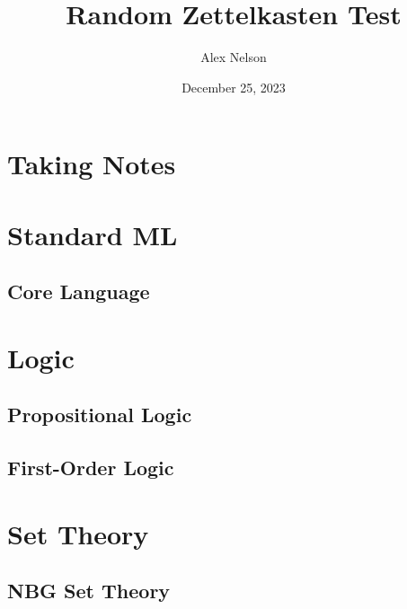 \documentclass[oneside]{amsbook}%
\title{Random Zettelkasten Test}
\author{Alex Nelson}
\date{December 25, 2023}
\begin{document}
\frontmatter
\maketitle
\tableofcontents
\mainmatter
\vfill\eject
\chapter{Taking Notes}


\chapter{Standard ML}

\section{Core Language}


\chapter{Logic}
\section{Propositional Logic}

\section{First-Order Logic}


\chapter{Set Theory}
\section{NBG Set Theory}





\backmatter
\nocite{*}

\end{document}
